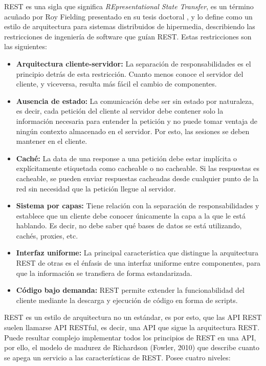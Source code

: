 REST es una sigla que significa \textit{REpresentational State Transfer}, es un término acuñado por Roy Fielding presentado en su tesis doctoral \cite{fieldingapi}, y lo define como un estilo de arquitectura para sistemas distribuidos de hipermedia, describiendo las restricciones de ingeniería de software que guían REST. Estas restricciones son las siguientes:
\begin{itemize}
    \item \textbf{Arquitectura cliente-servidor:} La separación de responsabilidades es el principio detrás de esta restricción. Cuanto menos conoce el servidor del cliente, y viceversa, resulta más fácil el cambio de componentes.
    \item \textbf{Ausencia de estado:} La comunicación debe ser sin estado por naturaleza, es decir, cada petición del cliente al servidor debe contener solo la información necesaria para entender la petición y no puede tomar ventaja de ningún contexto almacenado en el servidor. Por esto, las sesiones se deben mantener en el cliente.
    \item \textbf{Caché:} La data de una response a una petición debe estar implícita o explícitamente etiquetada como cacheable o no cacheable. Si las respuestas es cacheable, se pueden enviar respuestas cacheadas desde cualquier punto de la red sin necesidad que la petición llegue al servidor.
    \item \textbf{Sistema por capas:} Tiene relación con la separación de responsabilidades y establece que un cliente debe conocer únicamente la capa a la que le está hablando.  Es decir, no debe saber qué bases de datos se está utilizando, cachés, proxies, etc.
    \item \textbf{Interfaz uniforme:} La principal característica que distingue la arquitectura REST de otras es el énfasis de una interfaz uniforme entre componentes, para que la información se transfiera de forma estandarizada. 
    \item \textbf{Código bajo demanda:} REST permite extender la funcionabilidad del cliente mediante la descarga y ejecución de código en forma de scripts. 
\end{itemize}
REST es un estilo de arquitectura no un estándar, es por esto, que las API REST suelen llamarse API RESTful, es decir, una API que sigue la arquitectura REST. Puede resultar complejo implementar todos los principios de REST en una API, por ello, el modelo de madurez de Richardson (Fowler, 2010) que describe cuanto se apega un servicio a las características de REST. Posee cuatro niveles:

